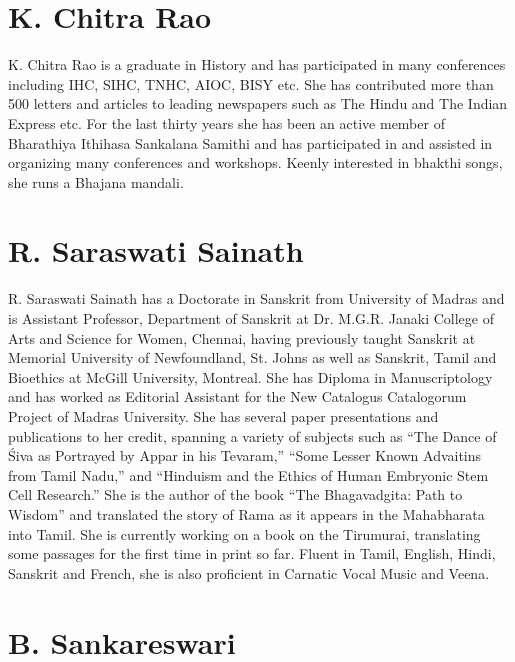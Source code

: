 \section*{K. Chitra Rao}

K. Chitra Rao is a graduate in History and has participated in many conferences including IHC, SIHC, TNHC, AIOC, BISY etc. She has contributed more than 500 letters and articles to leading newspapers such as The Hindu and The Indian Express etc. For the last thirty years she has been an active member of Bharathiya Ithihasa Sankalana Samithi and has participated in and assisted in organizing many conferences and workshops. Keenly interested in bhakthi songs, she runs a Bhajana mandali.

\section*{R. Saraswati Sainath}

R. Saraswati Sainath has a Doctorate in Sanskrit from University of Madras and is Assistant Professor, Department of Sanskrit at Dr. M.G.R. Janaki College of Arts and Science for Women, Chennai, having previously taught Sanskrit at Memorial University of Newfoundland, St. Johns as well as Sanskrit, Tamil and Bioethics at McGill University, Montreal. She has Diploma in Manuscriptology and has worked as Editorial Assistant for the New Catalogus Catalogorum Project of Madras University. She has several paper presentations and publications to her credit, spanning a variety of subjects such as “The Dance of Śiva as Portrayed by Appar in his Tevaram,” “Some Lesser Known Advaitins from Tamil Nadu,” and “Hinduism and the Ethics of Human Embryonic Stem Cell Research.” She is the author of the book “The Bhagavadgita: Path to Wisdom” and translated the story of Rama as it appears in the Mahabharata into Tamil. She is currently working on a book on the Tirumurai, translating some passages for the first time in print so far. Fluent in Tamil, English, Hindi, Sanskrit and French, she is also proficient in Carnatic Vocal Music and Veena.

\section*{B. Sankareswari}

